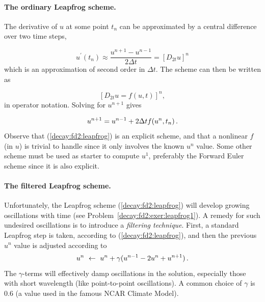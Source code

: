 \documentclass[%
oneside,                 %
final,                   %
10pt]{article}
\begin{document}

\paragraph{The ordinary Leapfrog scheme.}
The derivative of $u$ at some point $t_n$ can be approximated by
a central difference over two time steps,

\begin{equation}
u^{\prime}(t_n)\approx \frac{u^{n+1}-u^{n-1}}{2\Delta t} = [D_{2t}u]^n
\end{equation}
which is an approximation of second order in $\Delta t$. The scheme
can then be written as

\[ [D_{2t}u=f(u,t)]^n, \]
in operator notation. Solving for $u^{n+1}$ gives

\begin{equation}
u^{n+1} = u^{n-1} + 2\Delta t f(u^n, t_n)
\thinspace .
\label{decay:fd2:leapfrog}
\end{equation}
Observe that (\ref{decay:fd2:leapfrog}) is an explicit scheme, and that
a nonlinear $f$ (in $u$) is trivial to handle since it only involves
the known $u^n$ value.
Some other scheme must be used as starter to compute $u^1$, preferably
the Forward Euler scheme since it is also explicit.



\paragraph{The filtered Leapfrog scheme.}
Unfortunately, the Leapfrog scheme (\ref{decay:fd2:leapfrog})
will develop growing oscillations with time (see Problem~\ref{decay:fd2:exer:leapfrog1}). A remedy for such undesired oscillations
is to introduce a \emph{filtering technique}. First, a standard Leapfrog
step is taken, according to (\ref{decay:fd2:leapfrog}), and then
the previous $u^n$ value is adjusted according to
\begin{equation}
u^n\ \leftarrow\ u^n + \gamma (u^{n-1} - 2u^n + u^{n+1})
\label{decay:fd2:leapfrog:filtered}
\tp
\end{equation}
The $\gamma$-terms will effectively damp oscillations in the solution,
especially those with short wavelength (like point-to-point oscillations).
A common choice of $\gamma$ is 0.6 (a value used in the
famous NCAR Climate Model).

\end{document}
